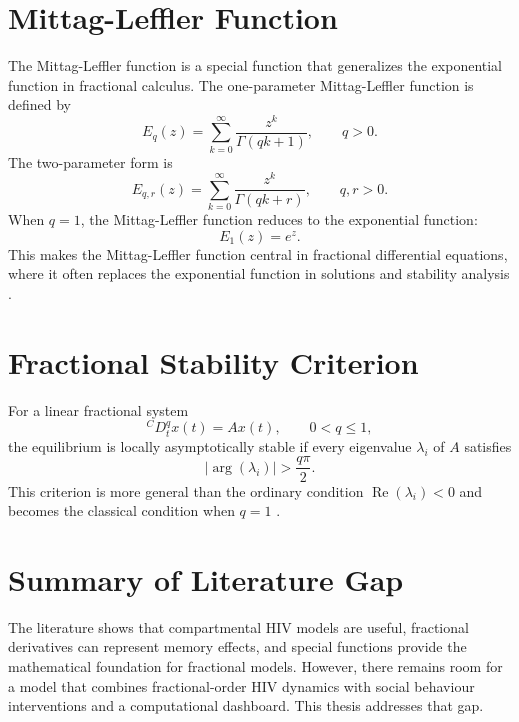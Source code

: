 \documentclass[12pt,a4paper,oneside]{report}
\newcommand{\CaputoD}[2]{{}^{C}D_{#1}^{#2}}
\begin{document}
\section{Mittag-Leffler Function}
The Mittag-Leffler function is a special function that generalizes the exponential function in fractional calculus. The one-parameter Mittag-Leffler function is defined by
\begin{equation}
E_q(z)=\sum_{k=0}^{\infty}\frac{z^k}{\Gamma(qk+1)}, \qquad q>0.
\end{equation}
The two-parameter form is
\begin{equation}
E_{q,r}(z)=\sum_{k=0}^{\infty}\frac{z^k}{\Gamma(qk+r)}, \qquad q,r>0.
\end{equation}
When $q=1$, the Mittag-Leffler function reduces to the exponential function:
\begin{equation}
E_1(z)=e^z.
\end{equation}
This makes the Mittag-Leffler function central in fractional differential equations, where it often replaces the exponential function in solutions and stability analysis \citep{Kilbas2006,Diethelm2010}.

\section{Fractional Stability Criterion}
For a linear fractional system
\begin{equation}
\CaputoD{t}{q}x(t)=Ax(t), \qquad 0<q\leq1,
\end{equation}
the equilibrium is locally asymptotically stable if every eigenvalue $\lambda_i$ of $A$ satisfies
\begin{equation}
|\arg(\lambda_i)|>\frac{q\pi}{2}.
\label{eq:fractional_stability}
\end{equation}
This criterion is more general than the ordinary condition $\operatorname{Re}(\lambda_i)<0$ and becomes the classical condition when $q=1$ \citep{Matignon1996}.

\section{Summary of Literature Gap}
The literature shows that compartmental HIV models are useful, fractional derivatives can represent memory effects, and special functions provide the mathematical foundation for fractional models. However, there remains room for a model that combines fractional-order HIV dynamics with social behaviour interventions and a computational dashboard. This thesis addresses that gap.
\end{document}

